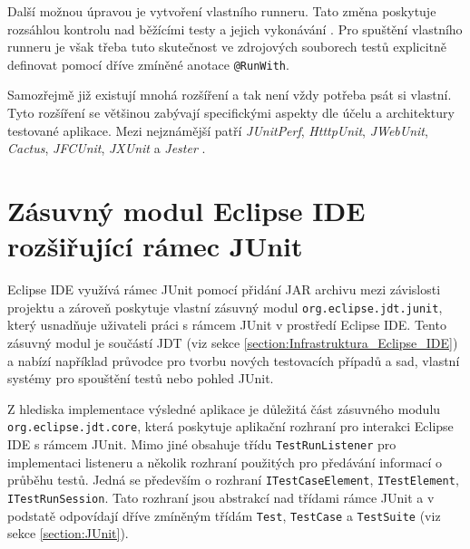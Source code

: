   Další možnou úpravou je vytvoření vlastního runneru. Tato změna poskytuje rozsáhlou kontrolu nad běžícími testy a jejich vykonávání \cite{JUnitGuide}. Pro spuštění vlastního runneru je však třeba tuto skutečnost ve zdrojových souborech testů explicitně definovat pomocí dříve zmíněné anotace \texttt{@RunWith}.

  Samozřejmě již existují mnohá rozšíření a tak není vždy potřeba psát si vlastní. Tyto rozšíření se většinou zabývají specifickými aspekty dle účelu a architektury testované aplikace. Mezi nejznámější patří \emph{JUnitPerf}, \emph{HtttpUnit}, \emph{JWebUnit}, \emph{Cactus}, \emph{JFCUnit}, \emph{JXUnit} a \emph{Jester} \cite{JUnitGuide}.

  \section{Zásuvný modul Eclipse IDE rozšiřující rámec JUnit}
  Eclipse IDE využívá rámec JUnit pomocí přidání JAR archivu mezi závislosti projektu a zároveň poskytuje vlastní zásuvný modul \texttt{org.eclipse.jdt.junit}, který usnadňuje uživateli práci s rámcem JUnit v prostředí Eclipse IDE. Tento zásuvný modul je součástí JDT (viz sekce \ref{section:Infrastruktura_Eclipse_IDE}) a nabízí například průvodce pro tvorbu nových testovacích případů a sad, vlastní systémy pro spouštění testů nebo pohled JUnit.

  Z hlediska implementace výsledné aplikace je důležitá část zásuvného modulu \texttt{org.eclipse.jdt.core}, která poskytuje aplikační rozhraní pro interakci Eclipse IDE s rámcem JUnit. Mimo jiné obsahuje třídu \texttt{TestRunListener} pro implementaci listeneru a několik rozhraní použitých pro předávání informací o průběhu testů. Jedná se především o rozhraní \texttt{ITestCaseElement}, \texttt{ITestElement}, \texttt{ITestRunSession}. Tato rozhraní jsou abstrakcí nad třídami rámce JUnit a v podstatě odpovídají dříve zmíněným třídám \texttt{Test}, \texttt{TestCase} a \texttt{TestSuite} (viz sekce \ref{section:JUnit}).
